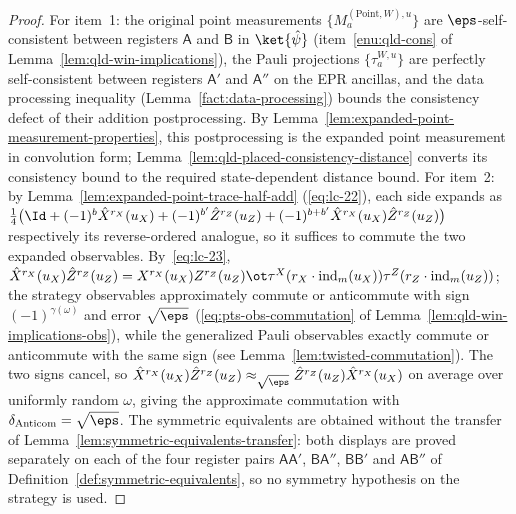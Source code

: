 \begin{proof}
	\leanok {}
	For item~1: the original point measurements
	$\{M^{(\mathrm{Point},W),u}_a\}$ are $\eps$-self-consistent between
	registers $\mathsf{A}$ and $\mathsf{B}$ in $\ket{\hat{\psi}}$
	(item~\ref{enu:qld-cons} of Lemma~\ref{lem:qld-win-implications}), the
	Pauli projections $\{\tau^{W,u}_a\}$ are perfectly self-consistent
	between registers $\mathsf{A}'$ and $\mathsf{A}''$ on the EPR ancillas,
	and the data processing inequality (Lemma~\ref{fact:data-processing})
	bounds the consistency defect of their addition postprocessing.
	By Lemma~\ref{lem:expanded-point-measurement-properties}, this
	postprocessing is the expanded point measurement in convolution form;
	Lemma~\ref{lem:qld-placed-consistency-distance} converts its consistency
	bound to the required state-dependent distance bound. For item~2:
	by Lemma~\ref{lem:expanded-point-trace-half-add}
	(\eqref{eq:lc-22}), each side expands as
	$\frac14 \big( \Id + (-1)^b \hat{X}^{r_X}(u_X) + (-1)^{b'} \hat{Z}^{r_Z}(u_Z) + (-1)^{b+b'} \hat{X}^{r_X}(u_X) \hat{Z}^{r_Z}(u_Z) \big)$
	respectively its reverse-ordered analogue, so it suffices to commute
	the two expanded observables. By~\eqref{eq:lc-23},
	$\hat{X}^{r_X}(u_X)\hat{Z}^{r_Z}(u_Z) = X^{r_X}(u_X) Z^{r_Z}(u_Z) \ot \tau^X(r_X \cdot \mathrm{ind}_m(u_X)) \tau^Z(r_Z \cdot \mathrm{ind}_m(u_Z))$;
	the strategy observables approximately commute or anticommute with sign
	$(-1)^{\gamma(\omega)}$ and error $\sqrt{\eps}$
	(\eqref{eq:pts-obs-commutation} of
	Lemma~\ref{lem:qld-win-implications-obs}), while the generalized Pauli
	observables exactly commute or anticommute with the same sign
	(see Lemma~\ref{lem:twisted-commutation}). The two signs cancel, so
	$\hat{X}^{r_X}(u_X)\hat{Z}^{r_Z}(u_Z) \approx_{\sqrt{\eps}} \hat{Z}^{r_Z}(u_Z)\hat{X}^{r_X}(u_X)$
	on average over uniformly random $\omega$, giving the approximate
	commutation with $\delta_{\mathrm{Anticom}} = \sqrt{\eps}$. The
	symmetric equivalents are obtained without the transfer of
	Lemma~\ref{lem:symmetric-equivalents-transfer}: both displays are proved
	separately on each of the four register pairs
	$\mathsf{A}\mathsf{A}'$, $\mathsf{B}\mathsf{A}''$, $\mathsf{B}\mathsf{B}'$ and
	$\mathsf{A}\mathsf{B}''$ of Definition~\ref{def:symmetric-equivalents}, so no
	symmetry hypothesis on the strategy is used.
\end{proof}


